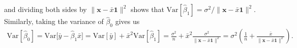 \documentclass[10pt]{article}
\begin{document}
\begin{itemize}
    and dividing both sides by \(\|\mathbf{x} - \bar{x}\mathbf{1}\|^2\) shows that 
    \(\mathrm{Var}[\hat{\beta}_1] = \sigma^2 / \|\mathbf{x} - \bar{x}\mathbf{1}\|^2\). 
    Similarly, taking the variance of \(\hat{\beta}_0\) gives us 
    \begin{align*}
        \mathrm{Var}[\hat{\beta}_0] = \mathrm{Var} \big[ \bar{y} - \hat{\beta}_1 \bar{x} \big]
        = \mathrm{Var}[\bar{y}] + \bar{x}^2 \mathrm{Var}[\hat{\beta}_1]
        = \frac{\sigma^2}{n} + \bar{x}^2\frac{\sigma^2}{\|\mathbf{x} - \bar{x}\mathbf{1}\|^2}
        = \sigma^2 \left( \frac{1}{n} + \frac{\bar{x}}{\|\mathbf{x} - \bar{x}\mathbf{1}\|^2} \right).
    \end{align*}
\end{itemize}

\end{document}
